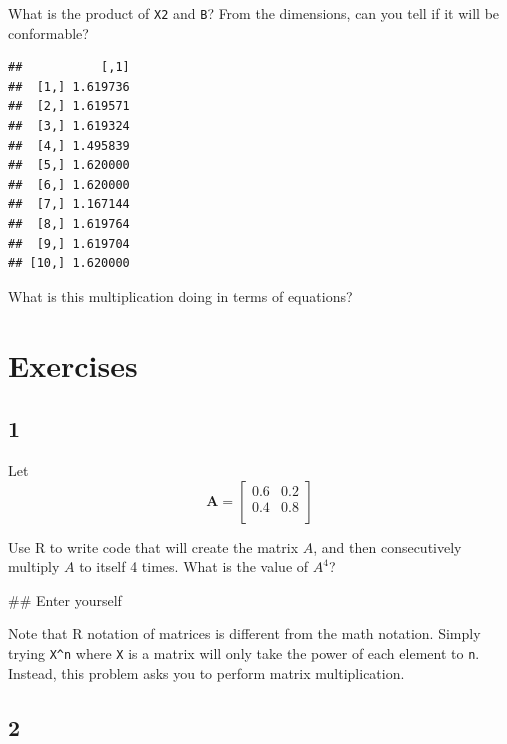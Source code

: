 \documentclass[]{book}
\newenvironment{Shaded}{\begin{snugshade}}{\end{snugshade}}
\newcommand{\StringTok}[1]{\textcolor[rgb]{0.31,0.60,0.02}{#1}}
\newcommand{\OperatorTok}[1]{\textcolor[rgb]{0.81,0.36,0.00}{\textbf{#1}}}
\newcommand{\NormalTok}[1]{#1}
\theoremstyle{definition}
\theoremstyle{definition}
\theoremstyle{definition}
\theoremstyle{remark}
\begin{document}
What is the product of \texttt{X2} and \texttt{B}? From the dimensions,
can you tell if it will be conformable?

\begin{Shaded}
\end{Shaded}

\begin{verbatim}
##           [,1]
##  [1,] 1.619736
##  [2,] 1.619571
##  [3,] 1.619324
##  [4,] 1.495839
##  [5,] 1.620000
##  [6,] 1.620000
##  [7,] 1.167144
##  [8,] 1.619764
##  [9,] 1.619704
## [10,] 1.620000
\end{verbatim}

What is this multiplication doing in terms of equations?

\section*{Exercises}\label{exercises-1}

\subsection*{1}\label{section-9}

Let \[\mathbf{A} = \left[\begin{array}
{rrr}
0.6 & 0.2\\
0.4 & 0.8\\
\end{array}\right]
\]

Use R to write code that will create the matrix \(A\), and then
consecutively multiply \(A\) to itself 4 times. What is the value of
\(A^{4}\)?

\begin{Shaded}
\begin{Highlighting}[]
\NormalTok{## Enter yourself}
\end{Highlighting}
\end{Shaded}

Note that R notation of matrices is different from the math notation.
Simply trying \texttt{X\^{}n} where \texttt{X} is a matrix will only
take the power of each element to \texttt{n}. Instead, this problem asks
you to perform matrix multiplication.

\subsection*{2}\label{section-10}
\end{document}
